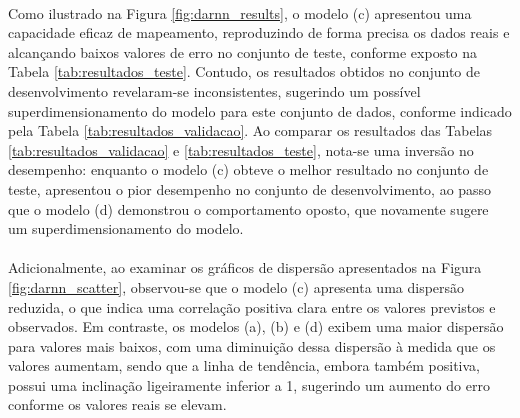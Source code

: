 \paragraph{} Como ilustrado na Figura \ref{fig:darnn_results}, o modelo (c) apresentou uma capacidade eficaz de mapeamento, reproduzindo de forma precisa os dados reais e alcançando baixos valores de erro no conjunto de teste, conforme exposto na Tabela \ref{tab:resultados_teste}. Contudo, os resultados obtidos no conjunto de desenvolvimento revelaram-se inconsistentes, sugerindo um possível superdimensionamento do modelo para este conjunto de dados, conforme indicado pela Tabela \ref{tab:resultados_validacao}. Ao comparar os resultados das Tabelas \ref{tab:resultados_validacao} e \ref{tab:resultados_teste}, nota-se uma inversão no desempenho: enquanto o modelo (c) obteve o melhor resultado no conjunto de teste, apresentou o pior desempenho no conjunto de desenvolvimento, ao passo que o modelo (d) demonstrou o comportamento oposto, que novamente sugere um superdimensionamento do modelo.
\paragraph{} Adicionalmente, ao examinar os gráficos de dispersão apresentados na Figura \ref{fig:darnn_scatter}, observou-se que o modelo (c) apresenta uma dispersão reduzida, o que indica uma correlação positiva clara entre os valores previstos e observados. Em contraste, os modelos (a), (b) e (d) exibem uma maior dispersão para valores mais baixos, com uma diminuição dessa dispersão à medida que os valores aumentam, sendo que a linha de tendência, embora também positiva, possui uma inclinação ligeiramente inferior a 1, sugerindo um aumento do erro conforme os valores reais se elevam.
